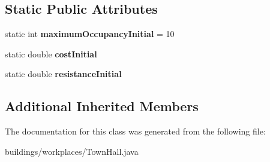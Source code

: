 \subsection*{Static Public Attributes}
\begin{DoxyCompactItemize}
\item 
static int {\bfseries maximum\+Occupancy\+Initial} = 10\hypertarget{classbuildings_1_1workplaces_1_1_town_hall_aa3ee04ec5a959468e1e61a483005a263}{}\label{classbuildings_1_1workplaces_1_1_town_hall_aa3ee04ec5a959468e1e61a483005a263}

\item 
static double {\bfseries cost\+Initial}\hypertarget{classbuildings_1_1workplaces_1_1_town_hall_a44e734d47aa6e1dc059be6fc5655eb74}{}\label{classbuildings_1_1workplaces_1_1_town_hall_a44e734d47aa6e1dc059be6fc5655eb74}

\item 
static double {\bfseries resistance\+Initial}\hypertarget{classbuildings_1_1workplaces_1_1_town_hall_a835dedb486eaf3505e9cbdeeef59e60a}{}\label{classbuildings_1_1workplaces_1_1_town_hall_a835dedb486eaf3505e9cbdeeef59e60a}

\end{DoxyCompactItemize}
\subsection*{Additional Inherited Members}


The documentation for this class was generated from the following file\+:\begin{DoxyCompactItemize}
\item 
buildings/workplaces/Town\+Hall.\+java\end{DoxyCompactItemize}
